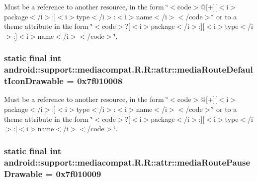 Must be a reference to another resource, in the form \char`\"{}$<$code$>$@\mbox{[}+\mbox{]}\mbox{[}$<$i$>$package$<$/i$>$:\mbox{]}$<$i$>$type$<$/i$>$:$<$i$>$name$<$/i$>$$<$/code$>$\char`\"{} or to a theme attribute in the form \char`\"{}$<$code$>$?\mbox{[}$<$i$>$package$<$/i$>$:\mbox{]}\mbox{[}$<$i$>$type$<$/i$>$:\mbox{]}$<$i$>$name$<$/i$>$$<$/code$>$\char`\"{}. \hypertarget{classandroid_1_1support_1_1mediacompat_1_1_r_1_1attr_bab959578b3a4e6856d894d9cdb22ab5}{
\subsubsection[{mediaRouteDefaultIconDrawable}]{\setlength{\rightskip}{0pt plus 5cm}static final int android::support::mediacompat.R.R::attr::mediaRouteDefaultIconDrawable = 0x7f010008}}
\label{classandroid_1_1support_1_1mediacompat_1_1_r_1_1attr_bab959578b3a4e6856d894d9cdb22ab5}


Must be a reference to another resource, in the form \char`\"{}$<$code$>$@\mbox{[}+\mbox{]}\mbox{[}$<$i$>$package$<$/i$>$:\mbox{]}$<$i$>$type$<$/i$>$:$<$i$>$name$<$/i$>$$<$/code$>$\char`\"{} or to a theme attribute in the form \char`\"{}$<$code$>$?\mbox{[}$<$i$>$package$<$/i$>$:\mbox{]}\mbox{[}$<$i$>$type$<$/i$>$:\mbox{]}$<$i$>$name$<$/i$>$$<$/code$>$\char`\"{}. \hypertarget{classandroid_1_1support_1_1mediacompat_1_1_r_1_1attr_fa0de083f149c3d626f6aba7fcf2f8f4}{
\subsubsection[{mediaRoutePauseDrawable}]{\setlength{\rightskip}{0pt plus 5cm}static final int android::support::mediacompat.R.R::attr::mediaRoutePauseDrawable = 0x7f010009}}
\label{classandroid_1_1support_1_1mediacompat_1_1_r_1_1attr_fa0de083f149c3d626f6aba7fcf2f8f4}


